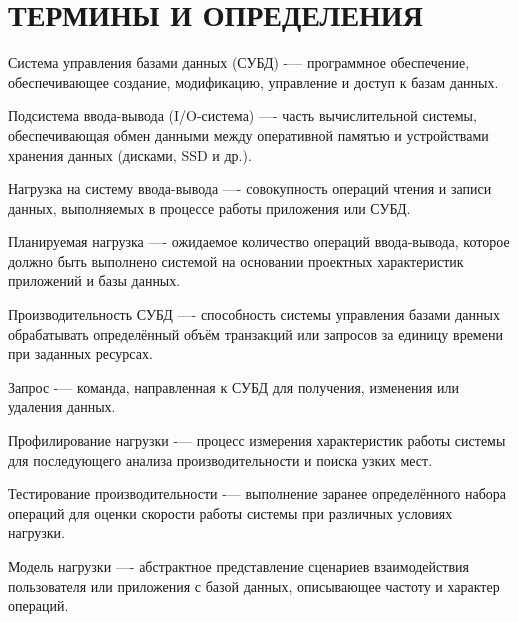      
\section*{\centering ТЕРМИНЫ И ОПРЕДЕЛЕНИЯ}

Система управления базами данных (СУБД) -— программное обеспечение, обеспечивающее создание, модификацию, управление и доступ к базам данных. \par

Подсистема ввода-вывода (I/O-система) —- часть вычислительной системы, обеспечивающая обмен данными между оперативной памятью и устройствами хранения данных (дисками, SSD и др.). \par

Нагрузка на систему ввода-вывода —- совокупность операций чтения и записи данных, выполняемых в процессе работы приложения или СУБД. \par

Планируемая нагрузка —- ожидаемое количество операций ввода-вывода, которое должно быть выполнено системой на основании проектных характеристик приложений и базы данных. \par

Производительность СУБД —- способность системы управления базами данных обрабатывать определённый объём транзакций или запросов за единицу времени при заданных ресурсах. \par

Запрос -— команда, направленная к СУБД для получения, изменения или удаления данных. \par

Профилирование нагрузки -— процесс измерения характеристик работы системы для последующего анализа производительности и поиска узких мест. \par

Тестирование производительности -— выполнение заранее определённого набора операций для оценки скорости работы системы при различных условиях нагрузки. \par

Модель нагрузки —- абстрактное представление сценариев взаимодействия пользователя или приложения с базой данных, описывающее частоту и характер операций. \par
